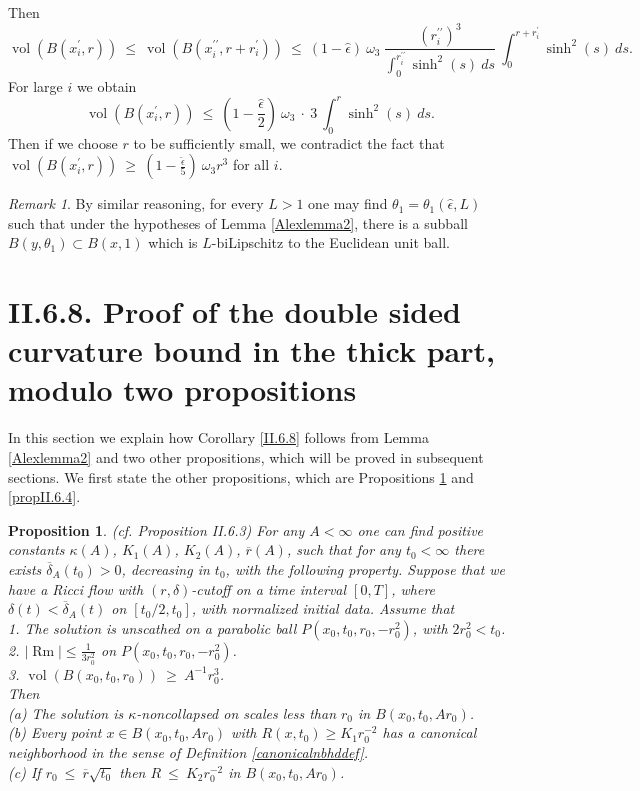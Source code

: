 \documentclass[12pt]{amsart}
\newcommand{\Rm}{\operatorname{Rm}}
\renewcommand{\th}{\theta}
\newcommand{\vol}{\operatorname{vol}}
\numberwithin{equation}{section}
\theoremstyle{plain}
\newtheorem{proposition}[equation]{Proposition}
\theoremstyle{definition}
\theoremstyle{remark}
\newtheorem{remark}[equation]{Remark}
\begin{document}
Then
\begin{equation}
\vol(B(x_i^\prime,
r)) \: \le \: 
\vol(B(x_i^{\prime \prime}, r + r_i^\prime)) \: \le \: 
(1-{\widehat{\epsilon}}) \: \omega_3 \: 
\frac{(r_i^{\prime \prime})^3}{\int_0^{r_i^{\prime \prime}} \sinh^2(s) \: ds}
\: \int_0^{r + r_i^\prime} \sinh^2(s) \: 
ds.
\end{equation}
For large $i$ we obtain
\begin{equation}
\vol(B(x_i^\prime,
r)) \: \le \:
(1-\frac{\widehat{\epsilon}}{2}) \: \omega_3 \: \cdot \: 3
\: \int_0^{r} \sinh^2(s) \: 
ds.
\end{equation}
Then if we choose $r$ to be 
sufficiently small, we contradict the fact that
$\vol(B(x_i^\prime, r)) \: \ge \: (1-\frac{\widehat{\epsilon}}{5}) \: \omega_3 
r^3$ for all $i$.

\begin{remark}
By similar reasoning, for every $L>1$ one may find 
$\th_1=\th_1(\widehat{\epsilon},L)$ such that
under the hypotheses of Lemma \ref{Alexlemma2}, there is a subball
$B(y,\th_1)\subset B(x,1)$ which is $L$-biLipschitz to the Euclidean
unit ball.
\end{remark}

\section{II.6.8. Proof of the double sided curvature bound in the
thick part, modulo two propositions}

In this section we explain how Corollary \ref{II.6.8}
follows from Lemma \ref{Alexlemma2} and two other
propositions, which will be proved in subsequent sections. 
We first state the other propositions,
which are Propositions \ref{propII.6.3} and \ref{propII.6.4}.

\begin{proposition} \label{propII.6.3}
(cf. Proposition II.6.3) 
For any 
$A < \infty$
one can find positive constants
$\kappa(A)$, $K_1(A)$, $K_2(A)$, $\overline{r}(A)$,
such that for any $t_0 < \infty$
there exists $\overline{\delta}_{A}(t_0)
> 0$, decreasing in $t_0$, 
with the following property.  Suppose that
we have a Ricci flow with $(r, \delta)$-cutoff on a time interval
$[0, T]$, where $\delta(t) < \overline{\delta}_A(t)$ on $[t_0/2, t_0]$, with
normalized initial data.  Assume that \\
1. The solution is unscathed on a parabolic ball
$P(x_0, t_0, r_0, -r_0^2)$, with $2r_0^2 < t_0$. \\
2. $|\Rm| \le \frac{1}{3r_0^2}$ on $P(x_0, t_0, r_0, -r_0^2)$. \\
3. $\vol(B(x_0, t_0, r_0)) \: \ge \: A^{-1} r_0^3$.\\

Then\\
(a) The solution is $\kappa$-noncollapsed on scales less than $r_0$
in $B(x_0, t_0, Ar_0)$.\\
(b) Every point $x \in B(x_0, t_0, Ar_0)$ with $R(x, t_0) \ge K_1 r_0^{-2}$
has a canonical neighborhood in the sense of
Definition \ref{canonicalnbhddef}.\\
(c) If $r_0 \: \le \: \overline{r} \sqrt{t_0}$ then $R \: \le \: K_2
r_0^{-2}$ in $B(x_0, t_0, Ar_0)$.
\end{proposition}
\end{document}
